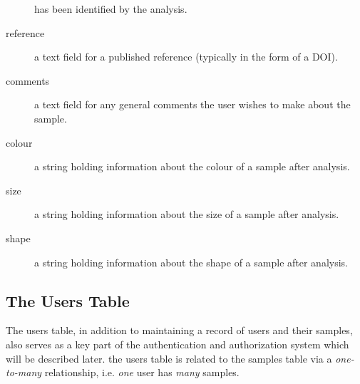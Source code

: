 \documentclass[12pt]{article}
\begin{document}
\begin{description}
has been identified by the analysis.
\item[reference]
a text field for a published reference (typically in the form of a DOI).
\item[comments]
a text field for any general comments the user wishes to make about the sample.
\item[colour]
a string holding information about the colour of a sample after analysis.
\item[size]
a string holding information about the size of a sample after analysis.
\item[shape]
a string holding information about the shape of a sample after analysis.
\end{description}

\subsection{The Users Table}
The users table, in addition to maintaining a record of users and their
samples, also serves as a key part of the authentication and authorization
system which will be described later. the users table is related to the
samples table via a \emph{one-to-many} relationship, i.e. \emph{one} user
has \emph{many} samples.
\end{document}

